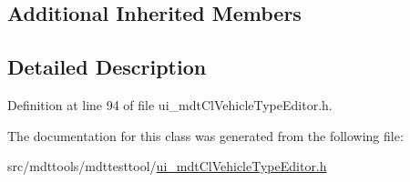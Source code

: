 \subsection*{Additional Inherited Members}


\subsection{Detailed Description}


Definition at line 94 of file ui\-\_\-mdt\-Cl\-Vehicle\-Type\-Editor.\-h.



The documentation for this class was generated from the following file\-:\begin{DoxyCompactItemize}
\item 
src/mdttools/mdttesttool/\hyperlink{ui__mdt_cl_vehicle_type_editor_8h}{ui\-\_\-mdt\-Cl\-Vehicle\-Type\-Editor.\-h}\end{DoxyCompactItemize}
